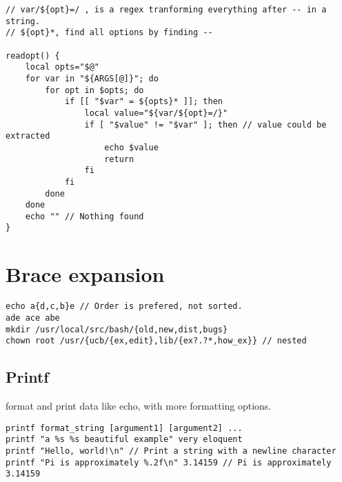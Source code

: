 \begin{verbatim}
// var/${opt}=/ , is a regex tranforming everything after -- in a string. 
// ${opt}*, find all options by finding --

readopt() {
    local opts="$@"
    for var in "${ARGS[@]}"; do
        for opt in $opts; do
            if [[ "$var" = ${opts}* ]]; then
                local value="${var/${opt}=/}"
                if [ "$value" != "$var" ]; then // value could be extracted
                    echo $value
                    return
                fi
            fi
        done
    done
    echo "" // Nothing found
}
\end{verbatim}

\section{Brace expansion}

\begin{verbatim}
echo a{d,c,b}e // Order is prefered, not sorted.
ade ace abe
mkdir /usr/local/src/bash/{old,new,dist,bugs}
chown root /usr/{ucb/{ex,edit},lib/{ex?.?*,how_ex}} // nested
\end{verbatim}

\subsection{Printf}

format and print data like echo, with more formatting options.

\begin{verbatim}
printf format_string [argument1] [argument2] ...
printf "a %s %s beautiful example" very eloquent
printf "Hello, world!\n" // Print a string with a newline character
printf "Pi is approximately %.2f\n" 3.14159 // Pi is approximately 3.14159
\end{verbatim}


